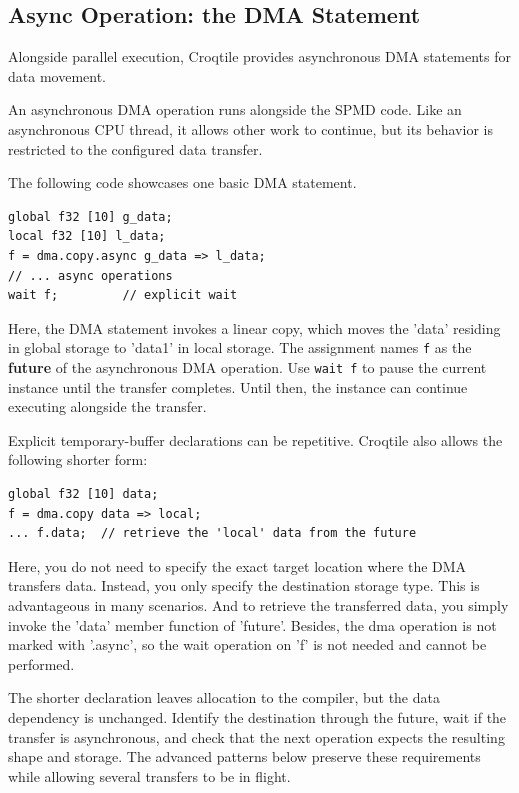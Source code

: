 \subsection*{Async Operation: the DMA Statement}

Alongside parallel execution, Croqtile provides asynchronous DMA statements for data movement.

An asynchronous DMA operation runs alongside the SPMD code. Like an asynchronous CPU thread, it allows other work to continue, but its behavior is restricted to the configured data transfer.

The following code showcases one basic DMA statement.

\begin{lstlisting}[language=croqtile,caption={An asynchronous DMA declaration}]
global f32 [10] g_data;
local f32 [10] l_data;
f = dma.copy.async g_data => l_data;
// ... async operations
wait f;         // explicit wait
\end{lstlisting}

Here, the DMA statement invokes a linear copy, which moves the 'data' residing in global storage to 'data1' in local storage. The assignment names \texttt{f} as the \textbf{future} of the asynchronous DMA operation. Use \texttt{wait f} to pause the current instance until the transfer completes. Until then, the instance can continue executing alongside the transfer.

Explicit temporary-buffer declarations can be repetitive. Croqtile also allows the following shorter form:

\begin{lstlisting}[language=croqtile,caption={The same declaration with storage}]
global f32 [10] data;
f = dma.copy data => local;
... f.data;  // retrieve the 'local' data from the future
\end{lstlisting}

Here, you do not need to specify the exact target location where the DMA transfers data. Instead, you only specify the destination storage type. This is advantageous in many scenarios. And to retrieve the transferred data, you simply invoke the 'data' member function of 'future'. Besides, the dma operation is not marked with '.async', so the wait operation on 'f' is not needed and cannot be performed.

The shorter declaration leaves allocation to the compiler, but the data dependency is unchanged. Identify the destination through the future, wait if the transfer is asynchronous, and check that the next operation expects the resulting shape and storage. The advanced patterns below preserve these requirements while allowing several transfers to be in flight.
